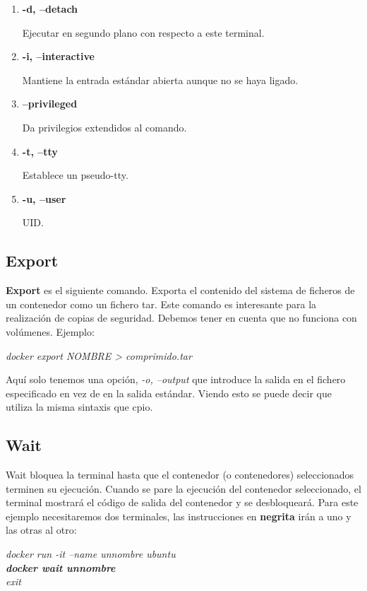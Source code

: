\documentclass[]{article}
\begin{document}
\begin{enumerate}
\renewcommand{\labelenumi}{$ \bullet $}
\item {\bf -d, --detach}

Ejecutar en segundo plano con respecto a este terminal.
\item {\bf -i, --interactive}

Mantiene la entrada estándar abierta aunque no se haya ligado.
\item {\bf --privileged}

Da privilegios extendidos al comando.
\item {\bf -t, --tty}

Establece un pseudo-tty.
\item {\bf -u, --user}

UID.

\end{enumerate}

\subsection{Export}
{\bf Export} es el siguiente comando.
Exporta el contenido del sistema de ficheros de un contenedor como un fichero tar.
Este comando es interesante para la realización de copias de seguridad.
Debemos tener en cuenta que no funciona con volúmenes.
Ejemplo:
\begin{center}
	\it
	docker export NOMBRE > comprimido.tar
\end{center}

Aquí solo tenemos una opción, {\it -o, --output} que introduce la salida en el fichero especificado en vez de en la salida estándar.
Viendo esto se puede decir que utiliza la misma sintaxis que cpio.

\subsection{Wait}
Wait bloquea la terminal hasta que el contenedor (o contenedores) seleccionados terminen su ejecución.
Cuando se pare la ejecución del contenedor seleccionado, el terminal mostrará el código de salida del contenedor y se desbloqueará.
Para este ejemplo necesitaremos dos terminales, las instrucciones en {\bf negrita} irán a uno y las otras al otro:
\begin{center}
	\textit{
		docker run -it --name unnombre ubuntu\\
		\textbf{docker wait unnombre}\\
		\it exit
	}
\end{center}
\end{document}
